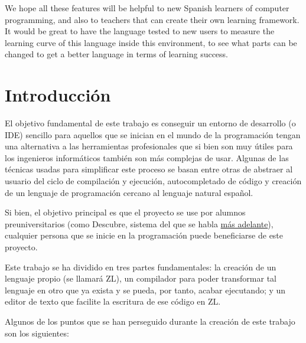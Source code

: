 \documentclass{report}
\begin{document}
	We hope all these features will be helpful to new Spanish learners of computer programming, and also to teachers that can create their own learning framework. It would be great to have the language tested to new users to measure the learning curve of this language inside this environment, to see what parts can be changed to get a better language in terms of learning success. 
	
	\chapter{Introducción}
	
	El objetivo fundamental de este trabajo es conseguir un entorno de desarrollo (o IDE) sencillo para aquellos que se inician en el mundo de la programación tengan una alternativa a las herramientas profesionales que si bien son muy útiles para los ingenieros informáticos también son más complejas de usar. Algunas de las técnicas usadas para simplificar este proceso se basan entre otras de abstraer al usuario del ciclo de compilación y ejecución, autocompletado de código y creación de un lenguaje de programación cercano al lenguaje natural español. 
	
	\vspace{10px}
	
	Si bien, el objetivo principal es que el proyecto se use por alumnos preuniversitarios (como Descubre, sistema del que se habla \hyperref[descubre]{más adelante}), cualquier persona que se inicie en la programación puede beneficiarse de este proyecto.
	
	\vspace{10px}
	
	Este trabajo se ha dividido en tres partes fundamentales: la creación de un lenguaje propio (se llamará ZL), un compilador para poder transformar tal lenguaje en otro que ya exista y se pueda, por tanto, acabar ejecutando; y un editor de texto que facilite la escritura de ese código en ZL.

	\vspace{10px}

	Algunos de los puntos que se han perseguido durante la creación de este trabajo son los siguientes:
	
\end{document}
